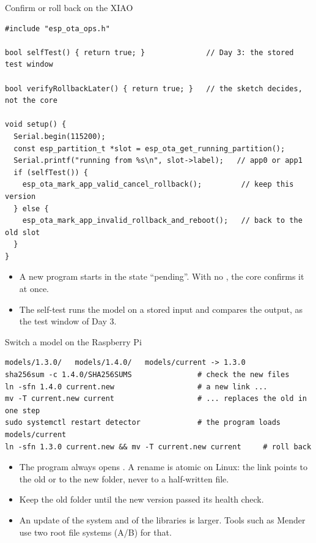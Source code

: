 \begin{frame}[fragile]{Confirm or roll back on the XIAO}
\begin{lstlisting}[style=cpp, basicstyle=\ttfamily\scriptsize]
#include "esp_ota_ops.h"

bool selfTest() { return true; }              // Day 3: the stored test window

bool verifyRollbackLater() { return true; }   // the sketch decides, not the core

void setup() {
  Serial.begin(115200);
  const esp_partition_t *slot = esp_ota_get_running_partition();
  Serial.printf("running from %s\n", slot->label);   // app0 or app1
  if (selfTest()) {
    esp_ota_mark_app_valid_cancel_rollback();         // keep this version
  } else {
    esp_ota_mark_app_invalid_rollback_and_reboot();   // back to the old slot
  }
}
\end{lstlisting}
  \small
  \begin{itemize}
    \item A new program starts in the state ``pending''. With no
          , the core confirms it at once.
    \item The self-test runs the model on a stored input and compares the
          output, as the test window of Day 3.
  \end{itemize}
\end{frame}

\begin{frame}[fragile]{Switch a model on the Raspberry Pi}
\begin{lstlisting}[style=shell]
models/1.3.0/   models/1.4.0/   models/current -> 1.3.0
sha256sum -c 1.4.0/SHA256SUMS               # check the new files
ln -sfn 1.4.0 current.new                   # a new link ...
mv -T current.new current                   # ... replaces the old in one step
sudo systemctl restart detector             # the program loads models/current
ln -sfn 1.3.0 current.new && mv -T current.new current     # roll back
\end{lstlisting}
  \small
  \begin{itemize}
    \item The program always opens . A rename is
          atomic on Linux: the link points to the old or to the new folder,
          never to a half-written file.
    \item Keep the old folder until the new version passed its health check.
    \item An update of the system and of the libraries is larger. Tools such
          as Mender use two root file systems (A/B) for that.
  \end{itemize}
\end{frame}

